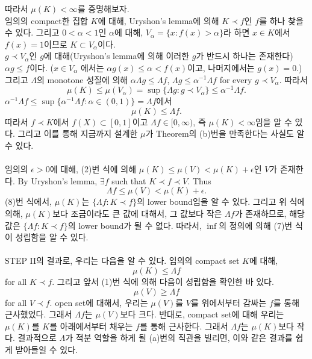 \documentclass[11pt,reqno]{amsart}
\renewcommand{\(}{\left(}
\renewcommand{\)}{\right)}
\renewcommand{\[}{\left[}
\renewcommand{\]}{\right]}
\newcommand{\ep}{\epsilon}
\begin{document}
따라서 $\mu(K) < \infty$를 증명해보자. \\
임의의 compact한 집합 $K$에 대해, Uryshon's lemma에 의해 $K \prec f$인 $f$를 하나 찾을 수 있다. 
그리고 $0 < \alpha < 1$인 $\alpha$에 대해, $V_\alpha = \{ x : f(x) > \alpha \}$라 하면 
$x \in K$에서 $f(x) = 1$이므로 $K \subset V_\alpha$이다. \\
$g \prec V_\alpha$인 $g$에 대해(Uryshon's lemma에 의해 이러한 $g$가 반드시 하나는 존재한다) 
$\alpha g \le f$이다. ($x \in V_\alpha$ 에서는 $\alpha g(x) \le \alpha < f(x)$이고, 나머지에서는 $g(x) = 0$.)
그리고 $\Lambda$의 monotone 성질에 의해 $\alpha \Lambda g \le \Lambda f$, $\Lambda g \le \alpha^{-1} \Lambda f$ 
for every $g \prec V_\alpha$.
따라서 \begin{equation*}
  \mu(K) \le \mu(V_\alpha) = \sup \{ \Lambda g : g \prec V_\alpha \} \le \alpha^{-1} \Lambda f.
\end{equation*}
$\alpha^{-1} \Lambda f \le \sup \{ \alpha^{-1} \Lambda f : \alpha \in (0, 1) \} = \Lambda f$에서
\begin{equation}
  \mu(K) \le \Lambda f.
\end{equation}
따라서 $f \prec K$에서 $f(X) \subset [0, 1]$이고 $\Lambda f \in [0, \infty)$, 즉 $\mu(K) < \infty$임을 알 수 있다. 
그리고 이를 통해 지금까지 설계한 $\mu$가 Theorem의 (b)번을 만족한다는 사실도 알 수 있다. \\ \\
임의의 $\ep > 0$에 대해, (2)번 식에 의해 $\mu(K) \le \mu(V) < \mu(K) + \ep$인 $V$가 존재한다. By Uryshon's lemma, 
$\exists f$ such that $K \prec f \prec V$. Thus \begin{equation*}
  \Lambda f \le \mu (V) < \mu (K) + \ep.
\end{equation*}
(8)번 식에서, $\mu(K)$는 $\{ \Lambda f : K \prec f \}$의 lower bound임을 알 수 있다. 그리고 위 식에 의해, 
$\mu(K)$보다 조금이라도 큰 값에 대해서, 그 값보다 작은 $\Lambda f$가 존재하므로, 해당 값은 
$\{ \Lambda f : K \prec f \}$의 lower bound가 될 수 없다. 따라서, $\inf$의 정의에 의해 (7)번 식이 성립함을 알 수 있다. \\ \\
STEP II의 결과로, 우리는 다음을 알 수 있다. 임의의 compact set $K$에 대해, 
\begin{equation*}
  \mu(K) \le \Lambda f
\end{equation*}
for all $K \prec f$. 그리고 앞서 (1)번 식에 의해 다음이 성립함을 확인한 바 있다.
\begin{equation*}
  \mu(V) \ge \Lambda f
\end{equation*}
for all $V \prec f$. open set에 대해서, 우리는 $\mu(V)$를 $V$를 위에서부터 감싸는 $f$를 통해 근사했었다. 그래서 $\Lambda f$는 
$\mu(V)$보다 크다. 반대로, compact set에 대해 우리는 $\mu(K)$를 $K$를 아래에서부터 채우는 $f$를 통해 근사한다. 그래서 $\Lambda f$는
$\mu(K)$보다 작다. 결과적으로 $\Lambda$가 적분 역할을 하게 될 (a)번의 직관을 빌리면, 이와 같은 결과를 쉽게 받아들일 수 있다.
\end{document}
